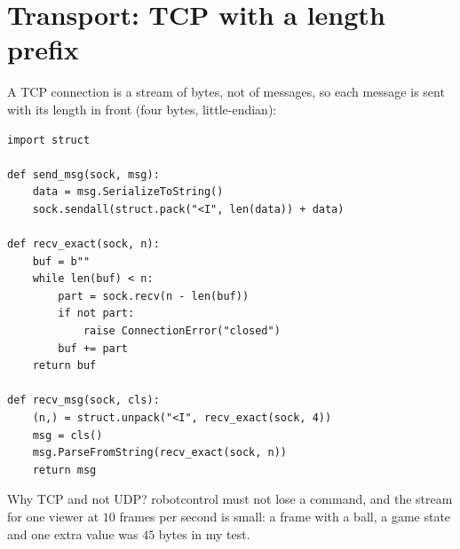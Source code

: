 \section*{Transport: TCP with a length prefix}
A TCP connection is a stream of bytes, not of messages, so each message is sent with its length in front (four bytes, little-endian):
\begin{verbatim}
import struct

def send_msg(sock, msg):
    data = msg.SerializeToString()
    sock.sendall(struct.pack("<I", len(data)) + data)

def recv_exact(sock, n):
    buf = b""
    while len(buf) < n:
        part = sock.recv(n - len(buf))
        if not part:
            raise ConnectionError("closed")
        buf += part
    return buf

def recv_msg(sock, cls):
    (n,) = struct.unpack("<I", recv_exact(sock, 4))
    msg = cls()
    msg.ParseFromString(recv_exact(sock, n))
    return msg
\end{verbatim}
Why TCP and not UDP? robotcontrol must not lose a command, and the stream for one viewer at $10$ frames per second is small: a frame with a ball, a game state and one extra value was $45$ bytes in my test.

